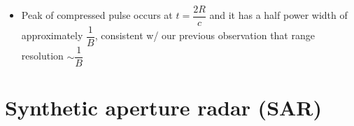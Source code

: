 \documentclass[11pt, oneside]{article}
\newcommand{\Vo}{V_\mathrm{o}}
\begin{document}
\begin{itemize}
\begin{itemize}
\begin{equation}
			\label{e:Vr}
			V_r(t) = E_rA\!\left(t - \frac{2R}{c}\right)
		\end{equation}
		\item[] then the compressed radar signal is the convolution
		\begin{align}
			\Vo(t) &= \int_{-\infty}^{\infty}A^*(\xi - t)\,V_r(\xi)\,d\xi \nonumber\\
			&\approx \tau_p|A_0|^2E_r\,e^{j(\omega_0t - 2kR)}\,\underbrace{\frac{\sin\!\left(\pi B(t - 2R/c)\right)}{\pi B(t - 2R/c)}}_{\text{norm.\ sinc function}} \label{e:Vo}
		\end{align}
	\end{itemize}
	\item Peak of compressed pulse occurs at $t = \dfrac{2R}{c}$ and it has a half power width of approximately $\dfrac{1}{B}$, consistent w/ our previous observation that range resolution $\sim \dfrac{1}{B}$
\end{itemize}

\section{Synthetic aperture radar (SAR)}
\label{s:sar}
\end{document}
